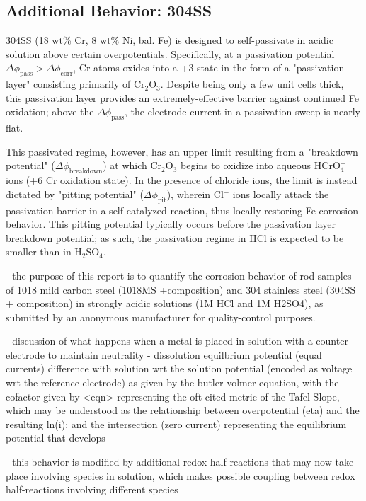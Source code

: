 \subsection{Additional Behavior: 304SS}

304SS (18 wt\% Cr, 8 wt\% Ni, bal. Fe) is designed to self-passivate in acidic solution above certain overpotentials. Specifically, at a passivation potential $\Delta \phi_{\text{pass}} > \Delta \phi_{\text{corr}}$, Cr atoms oxides into a +3 state in the form of a "passivation layer" consisting primarily of Cr$_2$O$_3$.  Despite being only a few unit cells thick, this passivation layer provides an extremely-effective barrier against continued Fe oxidation; above the $\Delta \phi_{\text{pass}}$, the electrode current in a passivation sweep is nearly flat.\cite{devine} 

This passivated regime, however, has an upper limit resulting from a "breakdown potential" ($\Delta \phi_{\text{breakdown}}$) at which Cr$_2$O$_3$ begins to oxidize into aqueous HCrO$_4^-$ ions (+6 Cr oxidation state).\cite{labguide}  In the presence of chloride ions, the limit is instead dictated by "pitting potential" ($\Delta \phi_{\text{pit}}$), wherein Cl$^-$ ions locally attack the passivation barrier in a self-catalyzed reaction, thus locally restoring Fe corrosion behavior.  This pitting potential typically occurs before the passivation layer breakdown potential; as such, the passivation regime in HCl is expected to be smaller than in H$_2$SO$_4$.\cite{gsi}

\iffalse
- the purpose of this report is to quantify the corrosion behavior of rod samples of 1018 mild carbon steel (1018MS +composition) and 304 stainless steel (304SS + composition) in strongly acidic solutions (1M HCl and 1M H2SO4), as submitted by an anonymous manufacturer for quality-control purposes.

- discussion of what happens when a metal is placed in solution with a counter-electrode to maintain neutrality - dissolution equilbrium potential (equal currents) difference with solution wrt the solution potential (encoded as voltage wrt the reference electrode) as given by the butler-volmer equation, with the cofactor given by <eqn> representing the oft-cited metric of the Tafel Slope, which may be understood as the relationship between overpotential (eta) and the resulting ln(i); and the intersection (zero current) representing the equilibrium potential that develops

- this behavior is modified by additional redox half-reactions that may now take place involving species in solution, which makes possible coupling between redox half-reactions involving different species

